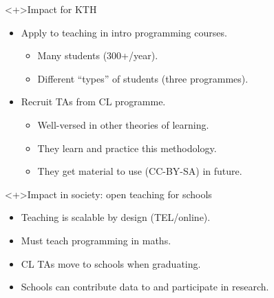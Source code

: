 \begin{frame}
  \begin{block}<+>{Impact for KTH}
    \begin{itemize}
      \item Apply to teaching in intro programming courses.
        \begin{itemize}
          \item Many students (300+/year).
          \item Different \enquote{types} of students (three programmes).
        \end{itemize}
      \item Recruit TAs from CL programme.
        \begin{itemize}
          \item Well-versed in other theories of learning.
          \item They learn and practice this methodology.
          \item They get material to use (CC-BY-SA) in future.
        \end{itemize}
    \end{itemize}
  \end{block}

  \begin{block}<+>{Impact in society: open teaching for schools}
    \begin{itemize}
      \item Teaching is scalable by design (TEL/online).
      \item Must teach programming in maths.
      \item CL TAs move to schools when graduating.
      \item Schools can contribute data to and participate in research.
    \end{itemize}
  \end{block}
\end{frame}
